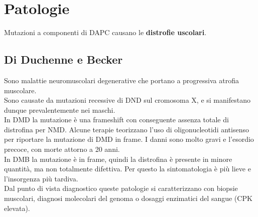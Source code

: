 \documentclass[a4paper, 12pt]{article}
\begin{document}
\section{Patologie}
Mutazioni a componenti di DAPC causano le \textbf{distrofie uscolari}.

\subsection{Di Duchenne e Becker}
Sono malattie neuromuscolari degenerative che portano a progressiva atrofia muscolare.\\
Sono causate da mutazioni recessive di DND sul cromosoma X, e si manifestano dunque prevalentemente nei maschi.\\
In DMD la mutazione è una frameshift con conseguente assenza totale di distrofina per NMD. Alcune terapie teorizzano l'uso di oligonucleotidi antisenso per riportare la mutazione di DMD in frame. I danni sono molto gravi e l'esordio precoce, con morte attorno a 20 anni.\\
In DMB la mutazione è in frame, quindi la distrofina è presente in minore quantità, ma non totalmente difettiva. Per questo la sintomatologia è più lieve e l'insorgenza più tardiva.\\
Dal punto di vista diagnostico queste patologie si caratterizzano con biopsie muscolari, diagnosi molecolari del genoma o dosaggi enzimatici del sangue (CPK elevata).
\end{document}
